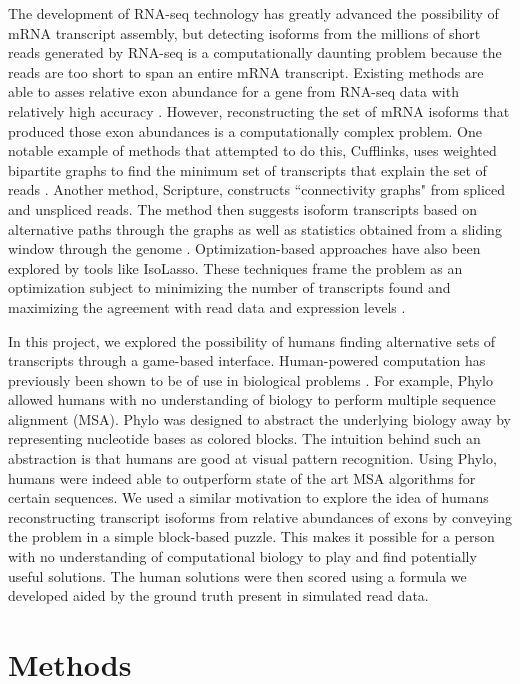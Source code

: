 \documentclass[12pt]{article}
\begin{document}
The development of RNA-seq technology has greatly advanced the possibility of mRNA transcript assembly, but detecting isoforms from the millions of short reads generated by RNA-seq is a computationally daunting problem because the reads are too short to span an entire mRNA transcript. Existing methods are able to asses relative exon abundance for a gene from RNA-seq data with relatively high accuracy \citep{trapnell2009tophat}. However, reconstructing the set of mRNA isoforms that produced those exon abundances is a computationally complex problem. One notable example of methods that attempted to do this, Cufflinks, uses weighted bipartite graphs to find the minimum set of transcripts that explain the set of reads \citep{trapnell2010transcript}. Another method, Scripture, constructs ``connectivity graphs" from spliced and unspliced reads. The method then suggests isoform transcripts based on alternative paths through the graphs as well as statistics obtained from a sliding window through the genome \citep{guttman2010ab}. Optimization-based approaches have also been explored by tools like IsoLasso. These techniques frame the problem as an optimization subject to minimizing the number of transcripts found and maximizing the agreement with read data and expression levels \citep{li2011isolasso}.

In this project, we explored the possibility of humans finding alternative sets of transcripts through a game-based interface. Human-powered computation has previously been shown to be of use in biological problems \citep{kawrykow2012phylo, cooper2010predicting}. For example, Phylo allowed humans with no understanding of biology to perform multiple sequence alignment (MSA). Phylo was designed to abstract the underlying biology away by representing nucleotide bases as colored blocks.  The intuition behind such an abstraction is that humans are good at visual pattern recognition. Using Phylo, humans were indeed able to outperform state of the art MSA algorithms for certain sequences. We used a similar motivation to explore the idea of humans reconstructing transcript isoforms from relative abundances of exons by conveying the problem in a simple block-based puzzle. This makes it possible for a person with no understanding of computational biology to play and find potentially useful solutions. The human solutions were then scored using a formula we developed aided by the ground truth present in simulated read data. 

\section*{Methods}
\end{document}
